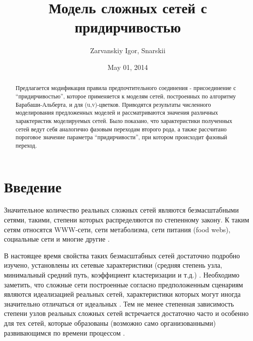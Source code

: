 \documentclass[10pt,aps,pra]{revtex4-1}
\begin{document}
\title{Модель сложных сетей с придирчивостью}
\author{Zarvanskiy Igor, Snarskii}


\date{May 01, 2014}

\begin{abstract}
    Предлагается модификация правила предпочтительного соединения - присоединение с ``придирчивостью'', которое применяется к моделям сетей, построенных по алгоритму Барабаши-Альберта, и для  (u,v)-цветков. Приводятся результаты численного моделирования предложенных моделей и рассматриваются значения различных характеристик моделируемых сетей. Было показано, что характеристики полученных сетей ведут себя аналогично фазовым переходам второго рода, а также рассчитано пороговое значение параметра ``придирчивости'', при котором происходит фазовый переход.
\end{abstract}

\maketitle

\linenumbers\par

\section{Введение}

    Значительное количество реальных сложных сетей являются безмасштабными сетями, такими, степени которых распределяются по степенному закону. К таким сетям относятся WWW-сети, сети метаболизма, сети питания (food webs), социальные сети и многие другие \cite{Dor2}.

    В настоящее время свойства таких безмасштабных сетей достаточно подробно изучено, установлены их сетевые характеристики (средняя степень узла, минимальный средний путь, коэффициент кластеризации и т.д.) \cite{Newman1}. Необходимо заметить, что сложные сети построенные согласно предположенным сценариям \cite{AlBa2} являются идеализацией реальных сетей, характеристики которых могут иногда значительно отличаться от идеальных \cite{Newman1}. Тем не менее степенная зависимость степени узлов реальных сложных сетей встречается достаточно часто и особенно для тех сетей, которые образованы (возможно само организованными) развивающимся по времени процессом \cite{Newman3, AlBa3}.
\end{document}
